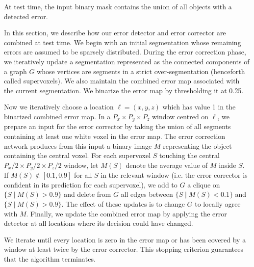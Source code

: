 \documentclass{article}
\begin{document}
At test time, the input binary mask contains the union of all objects with a detected error.

In this section, we describe how our error detector and error corrector are combined at test time. We begin with an initial segmentation whose remaining errors are assumed to be sparsely distributed. During the error correction phase, we iteratively update a segmentation represented as the connected components of a graph $G$ whose vertices are segments in a strict over-segmentation (henceforth called supervoxels). We also maintain the combined error map associated with the current segmentation. We binarize the error map by thresholding it at 0.25.

Now we iteratively choose a location $\ell=(x,y,z)$ which has value 1 in the binarized combined error map. In a $P_x \times P_y \times P_z$ window centred on $\ell$, we prepare an input for the error corrector by taking the union of all segments containing at least one white voxel in the error map. The error correction network produces from this input a binary image $M$ representing the object containing the central voxel. For each supervoxel $S$ touching the central $P_x/2 \times P_y/2 \times P_z/2$ window, let $M(S)$ denote the average value of $M$ inside $S$. If $M(S) \not \in [0.1,0.9]$ for all $S$ in the relevant window (i.e. the error corrector is confident in its prediction for each supervoxel), we add to $G$ a clique on $\{S \mid M(S) > 0.9\}$ and delete from $G$ all edges between $\{S \mid M(S) < 0.1\}$ and $\{S \mid M(S) > 0.9\}$. The effect of these updates is to change $G$ to locally agree with $M$. Finally, we update the combined error map by applying the error detector at all locations where its decision could have changed.

We iterate until every location is zero in the error map or has been covered by a window at least twice by the error corrector. This stopping criterion guarantees that the algorithm terminates.


\end{document}
